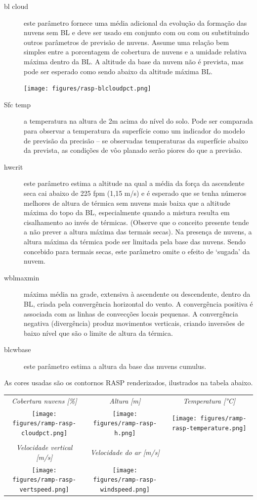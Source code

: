 \begin{description}
\item[bl cloud]  
este parâmetro fornece uma média adicional da evolução da formação das nuvens sem BL e deve ser usado em conjunto com ou com ou substituindo outros parâmetros de previsão de nuvens.  Assume uma relação bem simples entre a porcentagem de cobertura de nuvens e a umidade relativa máxima dentro da BL.  A altitude da base da nuvem não é prevista, mas pode ser esperado como sendo abaixo da altitude máxima BL.

\begin{center}
\texttt{[image: figures/rasp-blcloudpct.png]}
\end{center}

\item[Sfc temp] 
a temperatura na altura de 2m acima do nível do solo.  Pode ser comparada para observar a temperatura da superfície como um indicador do modelo de previsão da precisão – se observadas temperaturas da superfície abaixo da prevista, as condições de vôo planado serão piores do que a previsão.
\item[hwcrit]  
este parâmetro estima a altitude na qual a média da força da ascendente seca cai abaixo de 225 fpm (1,15 m/s) e é esperado que se tenha números melhores de altura de térmica sem nuvens mais baixa que a altitude máxima do topo da BL, especialmente quando a mistura resulta em cisalhamento ao invés de térmicas. (Observe que o conceito presente tende a não prever a altura máxima das termais secas).  Na presença de nuvens, a altura máxima da térmica pode ser limitada pela base das nuvens.  Sendo concebido para termais secas, este parâmetro omite o efeito de ‘sugada’ da nuvem.   
\item[wblmaxmin]  
máxima média na grade, extensiva à ascendente ou descendente, dentro da BL, criada pela convergência horizontal do vento.  A convergência positiva é associada com as linhas de convecções locais pequenas.  A convergência negativa (divergência) produz movimentos verticais, criando inversões de baixo nível que são o limite de altura da térmica.
\item[blcwbase] este parâmetro estima a altura da base das nuvens cumulus.  
\end{description}

\begin{maxipage}
As cores usadas são os contornos RASP renderizados, ilustrados na tabela abaixo.  

\begin{longtable}{c c c}
\em{Cobertura nuvens [\%]} & \em{Altura [m]} & \em{Temperatura [°C]} \\
\texttt{[image: figures/ramp-rasp-cloudpct.png]} &
\texttt{[image: figures/ramp-rasp-h.png]} &
\texttt{[image: figures/ramp-rasp-temperature.png]} \\
\\
\em{Velocidade vertical [m/s]} & \em{Velocidade do ar [m/s]} & \\
\texttt{[image: figures/ramp-rasp-vertspeed.png]} &
\texttt{[image: figures/ramp-rasp-windspeed.png]} & \\

\end{longtable}
\end{maxipage}

